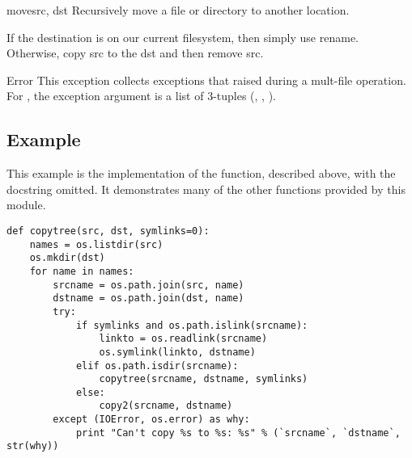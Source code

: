 \begin{funcdesc}{move}{src, dst}
Recursively move a file or directory to another location.

If the destination is on our current filesystem, then simply use
rename.  Otherwise, copy src to the dst and then remove src.

\end{funcdesc}

\begin{excdesc}{Error}
This exception collects exceptions that raised during a mult-file
operation. For , the exception argument is a
list of 3-tuples (, , ).

\end{excdesc}

\subsection{Example \label{shutil-example}}

This example is the implementation of the 
function, described above, with the docstring omitted.  It
demonstrates many of the other functions provided by this module.

\begin{verbatim}
def copytree(src, dst, symlinks=0):
    names = os.listdir(src)
    os.mkdir(dst)
    for name in names:
        srcname = os.path.join(src, name)
        dstname = os.path.join(dst, name)
        try:
            if symlinks and os.path.islink(srcname):
                linkto = os.readlink(srcname)
                os.symlink(linkto, dstname)
            elif os.path.isdir(srcname):
                copytree(srcname, dstname, symlinks)
            else:
                copy2(srcname, dstname)
        except (IOError, os.error) as why:
            print "Can't copy %s to %s: %s" % (`srcname`, `dstname`, str(why))
\end{verbatim}

